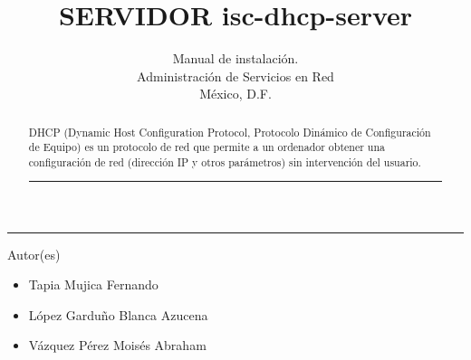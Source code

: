 \title{SERVIDOR isc-dhcp-server}
\author{Manual de instalación.\\
\small Administración de Servicios en Red\\
\small México, D.F.
}

\vspace{2cm}
\maketitle		
	\vspace*{-1cm}
	\begin{center}\rule{0.9\textwidth}{0.1mm}\end{center}
	\begin{abstract}
	\normalsize DHCP (Dynamic Host Configuration Protocol, Protocolo Dinámico de Configuración de Equipo) es un protocolo de red que permite a un ordenador obtener una configuración de red (dirección IP y otros parámetros) sin intervención del usuario.
	\begin{center}\rule{0.9\textwidth}{0.1mm}\end{center}
	\vspace*{0.5cm}
	\end{abstract}
	\vspace*{9cm}
\small Autor(es)
\begin{itemize}
	\item Tapia Mujica Fernando
	\item López Garduño Blanca Azucena
	\item Vázquez Pérez Moisés Abraham
\end{itemize}